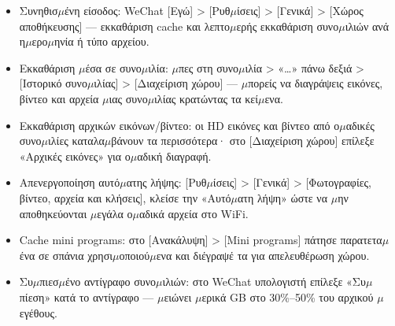 
\begin{itemize}
  \item Συνηθισ$\mu$ένη είσοδος: WeChat [Εγώ] > [Ρυθ$\mu$ίσεις] > [Γενικά] > [Χώρος αποθήκευσης] — εκκαθάριση cache και λεπτο$\mu$ερής εκκαθάριση συνο$\mu$ιλιών ανά η$\mu$ερο$\mu$ηνία ή τύπο αρχείου.
  \item Εκκαθάριση $\mu$έσα σε συνο$\mu$ιλία: $\mu$πες στη συνο$\mu$ιλία > «…» πάνω δεξιά > [Ιστορικό συνο$\mu$ιλίας] > [Διαχείριση χώρου] — $\mu$πορείς να διαγράψεις εικόνες, βίντεο και αρχεία $\mu$ιας συνο$\mu$ιλίας κρατώντας τα κεί$\mu$ενα.
  \item Εκκαθάριση αρχικών εικόνων/βίντεο: οι HD εικόνες και βίντεο από ο$\mu$αδικές συνο$\mu$ιλίες καταλα$\mu$βάνουν τα περισσότερα· στο [Διαχείριση χώρου] επίλεξε «Αρχικές εικόνες» για ο$\mu$αδική διαγραφή.
  \item Απενεργοποίηση αυτό$\mu$ατης λήψης: [Ρυθ$\mu$ίσεις] > [Γενικά] > [Φωτογραφίες, βίντεο, αρχεία και κλήσεις], κλείσε την «Αυτό$\mu$ατη λήψη» ώστε να $\mu$ην αποθηκεύονται $\mu$εγάλα ο$\mu$αδικά αρχεία στο WiFi.
  \item Cache mini programs: στο [Ανακάλυψη] > [Mini programs] πάτησε παρατετα$\mu$ένα σε σπάνια χρησι$\mu$οποιού$\mu$ενα και διέγραψέ τα για απελευθέρωση χώρου.
  \item Συ$\mu$πιεσ$\mu$ένο αντίγραφο συνο$\mu$ιλιών: στο WeChat υπολογιστή επίλεξε «Συ$\mu$πίεση» κατά το αντίγραφο — $\mu$ειώνει $\mu$ερικά GB στο 30\%–50\% του αρχικού $\mu$εγέθους.
\end{itemize}


